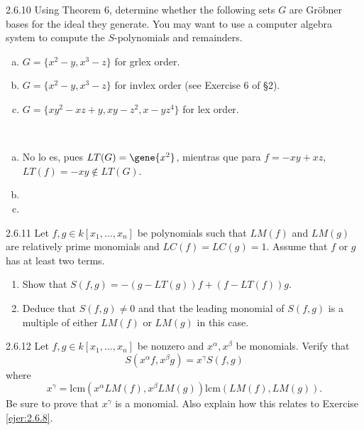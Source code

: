 \documentclass[twoside]{article}
\begin{document}
\newpage

\begin{ejercicio}{2.6.10}
Using Theorem 6, determine whether the following sets $G$ are Gröbner bases for the
ideal they generate. You may want to use a computer algebra system to compute the
$S$-polynomials and remainders.
\begin{enumerate}[a.]
\item $G = \{x^2 − y, x^3 − z\}$ for grlex order.
\item $G = \{x^2 − y, x^3 − z\}$ for invlex order (see Exercise 6 of §2).
\item $G = \{xy^2 − xz + y, xy − z^2, x − yz^4\}$ for lex order.
\end{enumerate}
\end{ejercicio}
\begin{solucion}\
\begin{enumerate}[a.]
\item No lo es, pues $LT(G)=\gene{x^2}$, mientras que para $f=-xy+xz$, $LT(f)=-xy\notin LT(G)$. 
\item 
\item 
\end{enumerate}
\end{solucion}

\newpage

\begin{ejercicio}{2.6.11}
Let $f , g ∈ k[x_1,\dots , x_n]$ be polynomials such that $LM( f )$ and $LM(g)$ are relatively prime
monomials and $LC( f) = LC(g) = 1$. Assume that $f$ or $g$ has at least two terms.
\begin{enumerate}
\item Show that $S( f , g) = −(g − LT(g))f + (f − LT( f ))g$.
\item Deduce that $S( f , g) \neq 0$ and that the leading monomial of $S( f , g)$ is a multiple of
either $LM( f )$ or $LM(g)$ in this case.
\end{enumerate}
\end{ejercicio}
\begin{solucion}

\end{solucion}

\newpage

\begin{ejercicio}{2.6.12}
Let $f , g ∈ k[x_1,\dots , x_n]$ be nonzero and $x^α, x^β$ be monomials. Verify that
$$S(x^αf , x^βg) = x^γS( f , g)$$
where
$$x^γ =
\mathrm{lcm}(x^αLM( f ), x^βLM(g))
\mathrm{lcm}(LM( f ), LM(g))
.$$
Be sure to prove that $x^{γ}$ is a monomial. Also explain how this relates to Exercise \ref{ejer:2.6.8}.
\end{ejercicio}
\begin{solucion}

\end{solucion}
\end{document}

